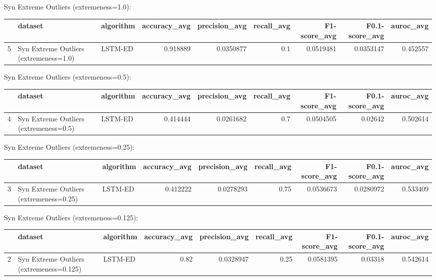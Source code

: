 Syn Extreme Outliers (extremeness=1.0):

\begin{tabular}{rllrrrrrr}
\hline
    & dataset                                & algorithm   &   accuracy\_avg &   precision\_avg &   recall\_avg &   F1-score\_avg &   F0.1-score\_avg &   auroc\_avg \\
\hline
  5 & Syn Extreme Outliers (extremeness=1.0) & LSTM-ED     &       0.918889 &       0.0350877 &          0.1 &      0.0519481 &        0.0353147 &    0.452557 \\
\hline
\end{tabular}

Syn Extreme Outliers (extremeness=0.5):

\begin{tabular}{rllrrrrrr}
\hline
    & dataset                                & algorithm   &   accuracy\_avg &   precision\_avg &   recall\_avg &   F1-score\_avg &   F0.1-score\_avg &   auroc\_avg \\
\hline
  4 & Syn Extreme Outliers (extremeness=0.5) & LSTM-ED     &       0.414444 &       0.0261682 &          0.7 &      0.0504505 &          0.02642 &    0.502614 \\
\hline
\end{tabular}

Syn Extreme Outliers (extremeness=0.25):

\begin{tabular}{rllrrrrrr}
\hline
    & dataset                                 & algorithm   &   accuracy\_avg &   precision\_avg &   recall\_avg &   F1-score\_avg &   F0.1-score\_avg &   auroc\_avg \\
\hline
  3 & Syn Extreme Outliers (extremeness=0.25) & LSTM-ED     &       0.412222 &       0.0278293 &         0.75 &      0.0536673 &        0.0280972 &    0.533409 \\
\hline
\end{tabular}

Syn Extreme Outliers (extremeness=0.125):

\begin{tabular}{rllrrrrrr}
\hline
    & dataset                                  & algorithm   &   accuracy\_avg &   precision\_avg &   recall\_avg &   F1-score\_avg &   F0.1-score\_avg &   auroc\_avg \\
\hline
  2 & Syn Extreme Outliers (extremeness=0.125) & LSTM-ED     &           0.82 &       0.0328947 &         0.25 &      0.0581395 &          0.03318 &    0.542614 \\
\hline
\end{tabular}

